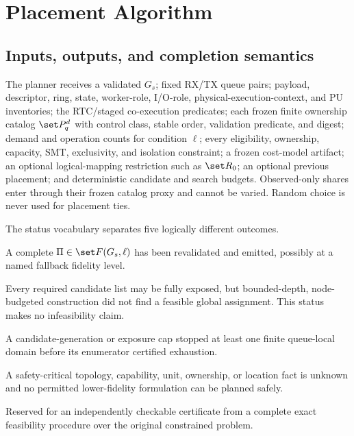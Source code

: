 \section{Placement Algorithm}
\label{sec:algorithm}

\subsection{Inputs, outputs, and completion semantics}

The planner receives a validated $G_s$; fixed RX/TX queue pairs; payload, descriptor, ring, state, worker-role, I/O-role, physical-execution-context, and PU inventories; the RTC/staged co-execution predicates; each frozen finite ownership catalog $\set P_q^d$ with control class, stable order, validation predicate, and digest; demand and operation counts for condition $\ell$; every eligibility, ownership, capacity, SMT, exclusivity, and isolation constraint; a frozen cost-model artifact; an optional logical-mapping restriction such as $\set R_0$; an optional previous placement; and deterministic candidate and search budgets. Observed-only shares enter through their frozen catalog proxy and cannot be varied. Random choice is never used for placement ties.

The status vocabulary separates five logically different outcomes.

\begin{description}[leftmargin=28mm,style=nextline,itemsep=2pt]
  \item[\normalfont\textsc{Feasible}] A complete $\Pi\in\set F(G_s,\ell)$ has been revalidated and emitted, possibly at a named fallback fidelity level.
  \item[\normalfont\textsc{Search-Limited}] Every required candidate list may be fully exposed, but bounded-depth, node-budgeted construction did not find a feasible global assignment. This status makes no infeasibility claim.
  \item[\normalfont\textsc{Cap-Limited}] A candidate-generation or exposure cap stopped at least one finite queue-local domain before its enumerator certified exhaustion.
  \item[\normalfont\textsc{Data-Incomplete}] A safety-critical topology, capability, unit, ownership, or location fact is unknown and no permitted lower-fidelity formulation can be planned safely.
  \item[\normalfont\textsc{Proven-Infeasible}] Reserved for an independently checkable certificate from a complete exact feasibility procedure over the original constrained problem.
\end{description}

